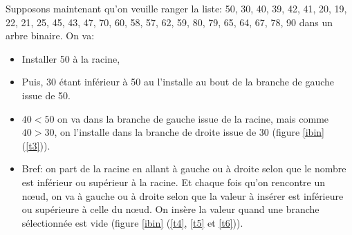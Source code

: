 Supposons maintenant qu'on veuille ranger la liste:  50, 30, 40, 39,
42, 41, 20, 19, 22, 21, 25, 45, 43, 47, 70, 60, 58, 57, 62, 59, 80,
79, 65, 64, 67, 78, 90 dans un arbre binaire. On va:

\begin{itemize}
\item Installer 50 à la racine,
\item Puis, 30 étant inférieur à 50 au l'installe au bout de la branche
de gauche issue de 50.
\item $40 < 50$ on va dans la branche de gauche issue de la racine,
  mais comme $40>30$, on l'installe dans la branche de droite issue de
  $30$ (figure \ref{ibin} (\ref{t3})).
\item Bref: on part de la racine en allant à gauche ou à droite selon
  que le nombre est inférieur ou supérieur à la racine. Et chaque fois
  qu'on rencontre un n{\oe}ud, on va à gauche ou à droite selon que la
  valeur à insérer est inférieure ou supérieure à celle du
  n{\oe}ud. On insère la valeur quand une branche sélectionnée est vide
  (figure \ref{ibin} (\ref{t4}, \ref{t5} et \ref{t6})).
\end{itemize}

